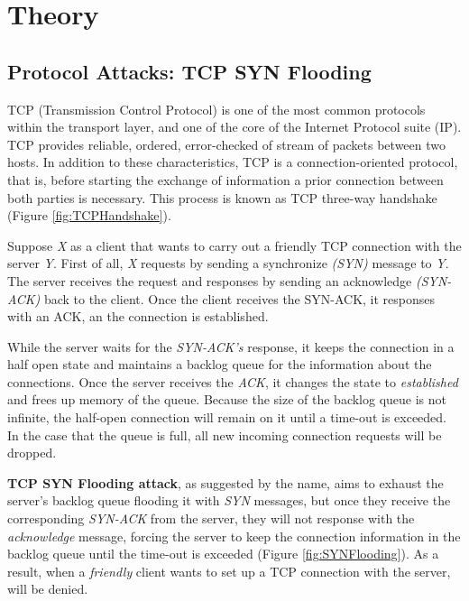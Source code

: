 

\chapter{Theory}
\label{chapter:theory}

\section{Protocol Attacks: TCP SYN Flooding}

TCP (Transmission Control Protocol) is one of the most common protocols within the transport layer, and one of the core of the Internet Protocol suite (IP). TCP provides reliable, ordered, error-checked of stream of packets between two hosts. In addition to these characteristics, TCP is a connection-oriented protocol, that is, before starting the exchange of information a prior connection between both parties is necessary. This process is known as TCP three-way handshake (Figure \ref{fig:TCPHandshake}).

\par

Suppose \textit{X} as a client that wants to carry out a friendly TCP connection with the server \textit{Y}. First of all, \textit{X} requests by sending a synchronize \textit{(SYN)} message to \textit{Y}. The server receives the request and responses by sending an acknowledge \textit{(SYN-ACK)} back to the client. Once the client receives the SYN-ACK, it responses with an ACK, an the connection is established. 

\par

While the server waits for the \textit{SYN-ACK's} response, it keeps the connection in a half open state and maintains a backlog queue for the information about the connections. Once the server receives the \textit{ACK}, it changes the state to \textit{established} and frees up memory of the queue. Because the size of the backlog queue is not infinite, the half-open connection will remain on it until a time-out is exceeded. In the case that the queue is full, all new incoming connection requests will be dropped.

\bigskip

\textbf{TCP SYN Flooding attack}, as suggested by the name, aims to exhaust the server's backlog queue flooding it with \textit{SYN} messages, but once they receive the corresponding \textit{SYN-ACK} from the server, they will not response with the \textit{acknowledge} message, forcing the server to keep the connection information in the backlog queue until the time-out is exceeded (Figure \ref{fig:SYNFlooding}). As a result, when a \textit{friendly} client wants to set up a TCP connection with the server, will be denied.

